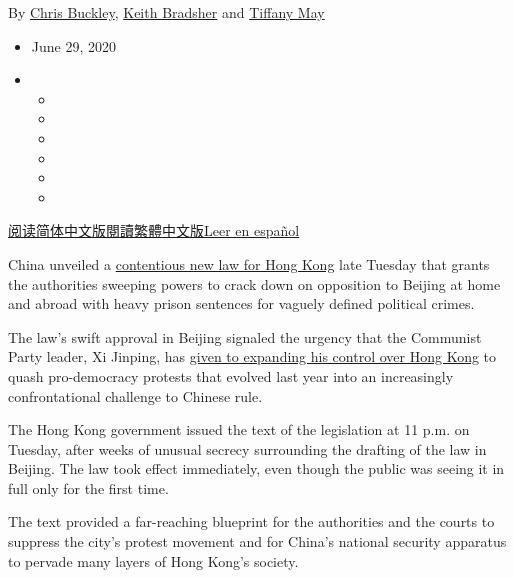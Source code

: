 By \href{https://www.nytimes3xbfgragh.onion/by/chris-buckley}{Chris
Buckley},
\href{https://www.nytimes3xbfgragh.onion/by/keith-bradsher}{Keith
Bradsher} and
\href{https://www.nytimes3xbfgragh.onion/by/tiffany-may}{Tiffany May}

\begin{itemize}
\item
  June 29, 2020
\item
  \begin{itemize}
  \item
  \item
  \item
  \item
  \item
  \item
  \end{itemize}
\end{itemize}

\href{https://cn.nytimes3xbfgragh.onion/china/20200630/china-hong-kong-security-law-rules/}{阅读简体中文版}\href{https://cn.nytimes3xbfgragh.onion/china/20200630/china-hong-kong-security-law-rules/}{閱讀繁體中文版}\href{https://www.nytimes3xbfgragh.onion/es/2020/06/30/espanol/mundo/hong-kong-china-leyes-seguridad.html}{Leer
en español}

China unveiled a
\href{https://www.nytimes3xbfgragh.onion/2020/07/07/business/hong-kong-security-law-tech.html}{contentious
new law for Hong Kong} late Tuesday that grants the authorities sweeping
powers to crack down on opposition to Beijing at home and abroad with
heavy prison sentences for vaguely defined political crimes.

The law's swift approval in Beijing signaled the urgency that the
Communist Party leader, Xi Jinping, has
\href{https://www.nytimes3xbfgragh.onion/2020/05/21/business/economy/coronavirus-china-economy.html}{given
to expanding his control over Hong Kong} to quash pro-democracy protests
that evolved last year into an increasingly confrontational challenge to
Chinese rule.

The Hong Kong government issued the text of the legislation at 11 p.m.
on Tuesday, after weeks of unusual secrecy surrounding the drafting of
the law in Beijing. The law took effect immediately, even though the
public was seeing it in full only for the first time.

The text provided a far-reaching blueprint for the authorities and the
courts to suppress the city's protest movement and for China's national
security apparatus to pervade many layers of Hong Kong's society.

